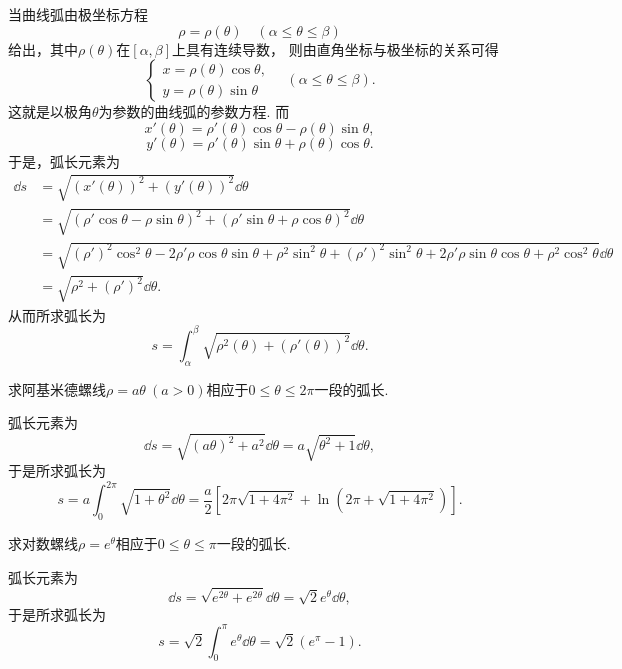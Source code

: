 当曲线弧由极坐标方程\[
	\rho=\rho(\theta)
	\quad(\alpha \leq \theta \leq \beta)
\]给出，其中\(\rho(\theta)\)在\([\alpha,\beta]\)上具有连续导数，
则由直角坐标与极坐标的关系可得\[
	\left\{ \begin{array}{c}
		x = \rho(\theta) \cos\theta, \\
		y = \rho(\theta) \sin\theta
	\end{array} \right.
	\quad(\alpha \leq \theta \leq \beta).
\]
这就是以极角\(\theta\)为参数的曲线弧的参数方程.
而\[
	x'(\theta) = \rho'(\theta) \cos\theta - \rho(\theta) \sin\theta,
\]\[
	y'(\theta) = \rho'(\theta) \sin\theta + \rho(\theta) \cos\theta.
\]
于是，弧长元素为\begin{align*}
	\dd{s}
	&= \sqrt{(x'(\theta))^2 + (y'(\theta))^2} \dd{\theta} \\
	&= \sqrt{(\rho' \cos\theta - \rho \sin\theta)^2
		+ (\rho' \sin\theta + \rho \cos\theta)^2} \dd{\theta} \\
	&= \sqrt{(\rho')^2\cos^2\theta-2\rho'\rho\cos\theta\sin\theta+\rho^2\sin^2\theta
		+ (\rho')^2\sin^2\theta+2\rho'\rho\sin\theta\cos\theta+\rho^2\cos^2\theta} \dd{\theta} \\
	&= \sqrt{\rho^2 + (\rho')^2} \dd{\theta}.
\end{align*}
从而所求弧长为\begin{equation}
	s = \int_{\alpha}^{\beta} \sqrt{\rho^2(\theta) + (\rho'(\theta))^2} \dd{\theta}.
\end{equation}

\begin{example}
求阿基米德螺线\(\rho=a\theta\ (a>0)\)相应于\(0\leq\theta\leq2\pi\)一段的弧长.
\begin{solution}
弧长元素为\[
	\dd{s} = \sqrt{(a\theta)^2 + a^2} \dd{\theta}
	= a\sqrt{\theta^2+1} \dd{\theta},
\]
于是所求弧长为\[
	s = a \int_0^{2\pi} \sqrt{1+\theta^2} \dd{\theta}
	= \frac{a}{2} \left[
	2\pi\sqrt{1+4\pi^2} + \ln(2\pi+\sqrt{1+4\pi^2})
	\right].
\]
\end{solution}
\end{example}

\begin{example}
求对数螺线\(\rho=e^{\theta}\)相应于\(0\leq\theta\leq\pi\)一段的弧长.
\begin{solution}
弧长元素为\[
	\dd{s} = \sqrt{e^{2\theta}+e^{2\theta}} \dd{\theta}
	= \sqrt{2}e^{\theta} \dd{\theta},
\]
于是所求弧长为\[
	s = \sqrt{2} \int_0^{\pi} e^{\theta} \dd{\theta}
	= \sqrt{2} (e^{\pi}-1).
\]
\end{solution}
\end{example}

